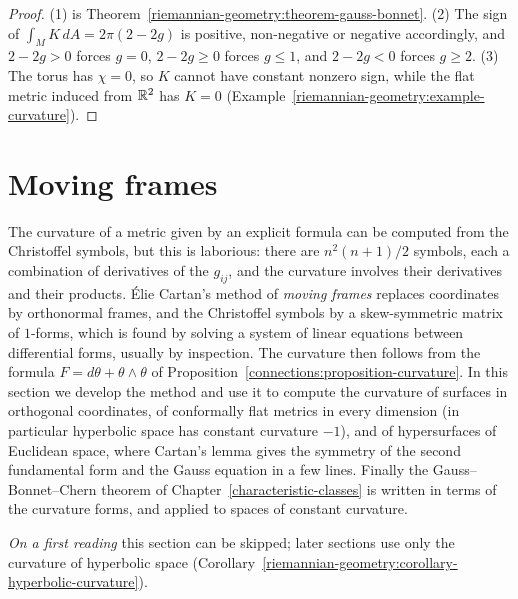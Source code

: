 \begin{proof}
(1) is Theorem~\ref{riemannian-geometry:theorem-gauss-bonnet}. (2) The sign of $\int_MK\,dA = 2\pi(2 - 2g)$ is positive, non-negative or negative accordingly, and $2 - 2g > 0$ forces $g = 0$, $2 - 2g \geq 0$ forces
$g \leq 1$, and $2 - 2g < 0$ forces $g \geq 2$. (3) The torus has $\chi = 0$, so $K$ cannot have constant nonzero sign, while the flat metric induced from $\mathbb{R}^2$ has $K = 0$ (Example~\ref{riemannian-geometry:example-curvature}).
\end{proof}

\section{Moving frames}\label{riemannian-geometry:section-moving-frames}

The curvature of a metric given by an explicit formula can be computed from the Christoffel symbols, but this is laborious: there are $n^2(n+1)/2$ symbols, each a combination of
derivatives of the $g_{ij}$, and the curvature involves their derivatives and their products. \'Elie Cartan's method of \emph{moving frames} replaces coordinates by orthonormal frames,
and the Christoffel symbols by a skew-symmetric matrix of $1$-forms, which is found by solving a system of linear equations between differential forms, usually by inspection. The
curvature then follows from the formula $F = d\theta + \theta \wedge \theta$ of Proposition~\ref{connections:proposition-curvature}. In this section we develop the method and use it to
compute the curvature of surfaces in orthogonal coordinates, of conformally flat metrics in every dimension (in particular hyperbolic space has constant curvature $-1$), and of
hypersurfaces of Euclidean space, where Cartan's lemma gives the symmetry of the second fundamental form and the Gauss equation in a few lines. Finally the Gauss--Bonnet--Chern
theorem of Chapter~\ref{characteristic-classes} is written in terms of the curvature forms, and applied to spaces of constant curvature.

\emph{On a first reading} this section can be skipped; later sections use only the curvature of hyperbolic space
(Corollary~\ref{riemannian-geometry:corollary-hyperbolic-curvature}).


